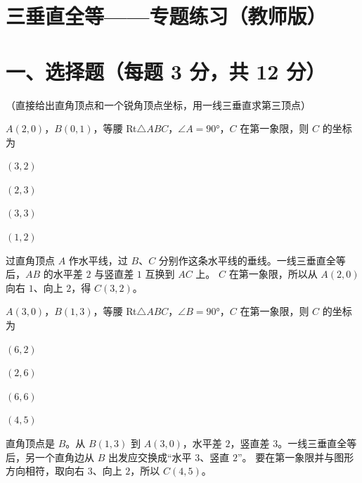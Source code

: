 \documentclass{exam-zh}
\begin{document}
\section*{三垂直全等——专题练习（教师版）}

\section*{一、选择题（每题 3 分，共 12 分）}
（直接给出直角顶点和一个锐角顶点坐标，用一线三垂直求第三顶点）


\begin{question}[points=3]
  $A(2, 0)$，$B(0, 1)$，等腰 Rt$\triangle ABC$，$\angle A = 90°$，$C$ 在第一象限，则 $C$ 的坐标为
  \begin{choices}
    \item $(3, 2)$
    \item $(2, 3)$
    \item $(3, 3)$
    \item $(1, 2)$
  \end{choices}
  \paren[A]
  \begin{solutionblock}
    过直角顶点 $A$ 作水平线，过 $B$、$C$ 分别作这条水平线的垂线。一线三垂直全等后，$AB$ 的水平差 $2$ 与竖直差 $1$ 互换到 $AC$ 上。
    $C$ 在第一象限，所以从 $A(2,0)$ 向右 $1$、向上 $2$，得 $C(3,2)$。
  \end{solutionblock}
\end{question}



\begin{question}[points=3]
  $A(3, 0)$，$B(1, 3)$，等腰 Rt$\triangle ABC$，$\angle B = 90°$，$C$ 在第一象限，则 $C$ 的坐标为
  \begin{choices}
    \item $(6, 2)$
    \item $(2, 6)$
    \item $(6, 6)$
    \item $(4, 5)$
  \end{choices}
  \paren[D]
  \begin{solutionblock}
    直角顶点是 $B$。从 $B(1,3)$ 到 $A(3,0)$，水平差 $2$，竖直差 $3$。一线三垂直全等后，另一个直角边从 $B$ 出发应交换成“水平 $3$、竖直 $2$”。
    要在第一象限并与图形方向相符，取向右 $3$、向上 $2$，所以 $C(4,5)$。
  \end{solutionblock}
\end{question}
\end{document}
